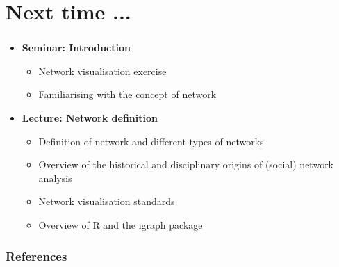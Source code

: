 \documentclass[8pt]{beamer}
\begin{document}







\section*{Next time ...}

\begin{frame}
\frametitle{\insertsection}

\begin{itemize}
\item 	\textbf{Seminar: Introduction}
		\begin{itemize}
		\item Network visualisation exercise
		\item Familiarising with the concept of network
		\end{itemize}
\medskip
\medskip
\item 	\textbf{Lecture: Network definition}
		\begin{itemize}
		\item Definition of network and different types of networks
		\item Overview of the historical and disciplinary origins of (social) network analysis
		\item Network visualisation standards
		\item Overview of R and the igraph package 
		\end{itemize}
\end{itemize}



\end{frame}




\bgroup
{}
\begin{frame}[plain]{}
\begin{center}
\color{white}{\Huge Questions}
\end{center}
\end{frame}
\egroup



\begin{frame}[allowframebreaks]
\frametitle{References}

\tiny


%
\end{frame}
\end{document}
